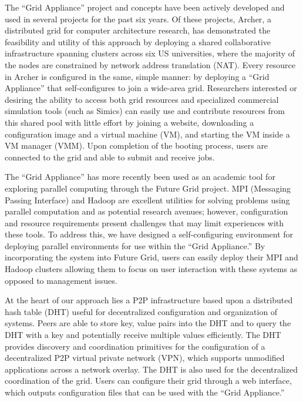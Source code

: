 \documentclass[twocolumn]{svjour3}
\begin{document}
The ``Grid Appliance'' project and concepts have been actively developed and
used in several projects for the past six years.  Of these projects, Archer, a
distributed grid for computer architecture research, has demonstrated the
feasibility and utility of this approach by deploying a shared collaborative
infrastructure spanning clusters across six US universities, where the majority
of the nodes are constrained by network address translation (NAT).  Every
resource in Archer is configured in the same, simple manner:  by deploying a
``Grid Appliance'' that self-configures to join a wide-area grid.  Researchers
interested or desiring the ability to access both grid resources and
specialized commercial simulation tools (such as Simics) can easily use and
contribute resources from this shared pool with little effort by joining a
website, downloading a configuration image and a virtual machine (VM), and
starting the VM inside a VM manager (VMM).  Upon completion of the booting
process, users are connected to the grid and able to submit and receive jobs.

The ``Grid Appliance'' has more recently been used as an academic tool for
exploring parallel computing through the Future Grid project.  MPI (Messaging
Passing Interface) and Hadoop are excellent utilities for solving problems
using parallel computation and as potential research avenues; however,
configuration and resource requirements present challenges that may limit
experiences with these tools.  To address this, we have designed a
self-configuring environment for deploying parallel environments for use within
the ``Grid Appliance.'' By incorporating the system into Future Grid, users can
easily deploy their MPI and Hadoop clusters allowing them to focus on user
interaction with these systems as opposed to management issues.

At the heart of our approach lies a P2P infrastructure based upon a distributed
hash table (DHT) useful for decentralized configuration and organization of
systems.  Peers are able to store key, value pairs into the DHT and to query
the DHT with a key and potentially receive multiple values efficiently.  The
DHT provides discovery and coordination primitives for the configuration of a
decentralized P2P virtual private network (VPN), which supports unmodified
applications across a network overlay.  The DHT is also used for the
decentralized coordination of the grid.  Users can configure their grid through
a web interface, which outputs configuration files that can be used with the
``Grid Appliance.''
\end{document}

